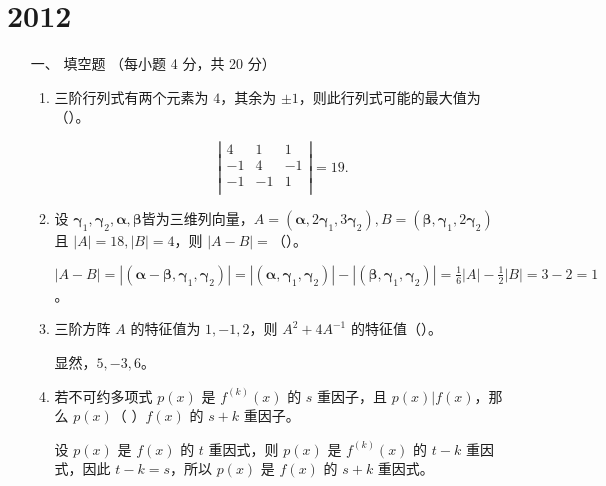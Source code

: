 \section{2012}
\begin{enumerate}[1~]
\renewcommand{\labelenumi}{\textbf{\theenumi. }}
\renewcommand{\Im}{\text{Im }}
\item[一、]
填空题 （每小题 4 分，共 20 分）
\begin{enumerate}[1.~]
\item
三阶行列式有两个元素为 $4$，其余为 $\pm 1$，则此行列式可能的最大值为（\quad）。 
\begin{solution}
$$\left| \begin{matrix}
	4&		1&		1\\
	-1&		4&		-1\\
	-1&		-1&		1\\
\end{matrix} \right|=19.$$
\end{solution}

\item
设 $\boldsymbol{\gamma} _ { 1 } , \boldsymbol{\gamma} _ { 2 } , \boldsymbol{\alpha} , \boldsymbol{\beta}$皆为三维列向量，$A = \left( \boldsymbol{\alpha} , 2 \boldsymbol{\gamma} _ { 1 } , 3 \boldsymbol{\gamma} _ { 2 } \right) , B = \left( \boldsymbol{\beta} , \boldsymbol{\gamma} _ { 1 } , 2 \boldsymbol{\gamma} _ { 2 } \right)$ 且 $| A | = 18 , | B | = 4$，则 $|A - B| =$（\quad）。 
\begin{solution}
$|A-B|=|(\boldsymbol{\alpha}-\boldsymbol{\beta}, \boldsymbol{\gamma}_1, \boldsymbol{\gamma}_2)|=|(\boldsymbol{\alpha}, \boldsymbol{\gamma}_1, \boldsymbol{\gamma}_2)|-|(\boldsymbol{\beta}, \boldsymbol{\gamma}_1, \boldsymbol{\gamma}_2)|=\frac16 |A|- \frac12 |B|=3-2=1$。
\end{solution}

\item
三阶方阵 $A$ 的特征值为 $1 , - 1, 2$，则 $A ^ { 2 } + 4 A ^ { - 1 }$ 的特征值（\quad）。 

\begin{solution}
显然，$5, -3, 6$。
\end{solution}

\item
若不可约多项式 $ p(x) $ 是 $ f^{(k)}(x)$ 的 $s$ 重因子，且 $p ( x ) | f ( x )$，那么 $ p(x) $（ \quad ）$f(x)$ 的 $s + k$ 重因子。

\begin{solution}
设 $p(x)$ 是 $f(x)$ 的 $t$ 重因式，则 $p(x)$ 是 $f^{(k)}(x)$ 的 $t - k$ 重因式，因此 $t - k =s$，所以 $p(x)$ 是 $f(x)$ 的 $s+ k$ 重因式。
\end{solution}


\end{enumerate}
\end{enumerate}
